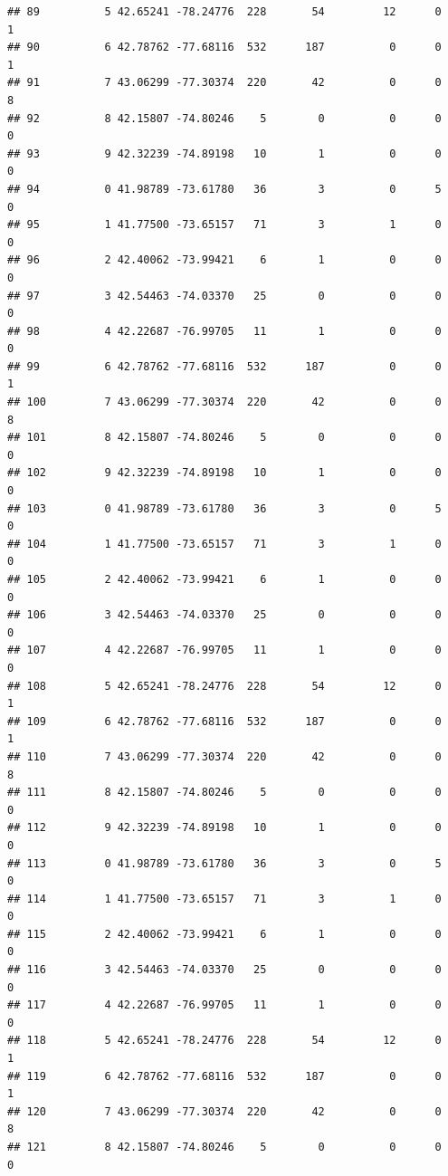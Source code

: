 \documentclass[
]{article}
\begin{document}
\begin{verbatim}
## 89          5 42.65241 -78.24776  228       54         12      0            1
## 90          6 42.78762 -77.68116  532      187          0      0            1
## 91          7 43.06299 -77.30374  220       42          0      0            8
## 92          8 42.15807 -74.80246    5        0          0      0            0
## 93          9 42.32239 -74.89198   10        1          0      0            0
## 94          0 41.98789 -73.61780   36        3          0      5            0
## 95          1 41.77500 -73.65157   71        3          1      0            0
## 96          2 42.40062 -73.99421    6        1          0      0            0
## 97          3 42.54463 -74.03370   25        0          0      0            0
## 98          4 42.22687 -76.99705   11        1          0      0            0
## 99          6 42.78762 -77.68116  532      187          0      0            1
## 100         7 43.06299 -77.30374  220       42          0      0            8
## 101         8 42.15807 -74.80246    5        0          0      0            0
## 102         9 42.32239 -74.89198   10        1          0      0            0
## 103         0 41.98789 -73.61780   36        3          0      5            0
## 104         1 41.77500 -73.65157   71        3          1      0            0
## 105         2 42.40062 -73.99421    6        1          0      0            0
## 106         3 42.54463 -74.03370   25        0          0      0            0
## 107         4 42.22687 -76.99705   11        1          0      0            0
## 108         5 42.65241 -78.24776  228       54         12      0            1
## 109         6 42.78762 -77.68116  532      187          0      0            1
## 110         7 43.06299 -77.30374  220       42          0      0            8
## 111         8 42.15807 -74.80246    5        0          0      0            0
## 112         9 42.32239 -74.89198   10        1          0      0            0
## 113         0 41.98789 -73.61780   36        3          0      5            0
## 114         1 41.77500 -73.65157   71        3          1      0            0
## 115         2 42.40062 -73.99421    6        1          0      0            0
## 116         3 42.54463 -74.03370   25        0          0      0            0
## 117         4 42.22687 -76.99705   11        1          0      0            0
## 118         5 42.65241 -78.24776  228       54         12      0            1
## 119         6 42.78762 -77.68116  532      187          0      0            1
## 120         7 43.06299 -77.30374  220       42          0      0            8
## 121         8 42.15807 -74.80246    5        0          0      0            0

\end{verbatim}
\end{document}
